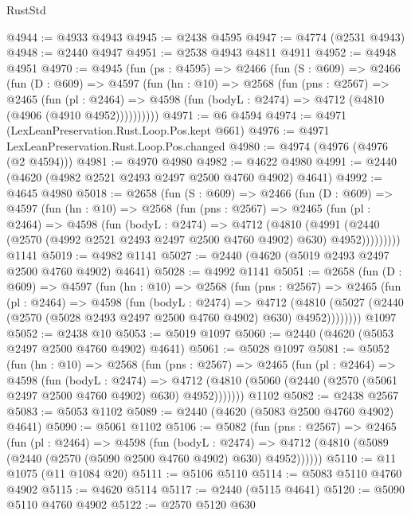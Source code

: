 \begin{lexlean}{RustStd}
\begin{coremodule}
{\begin{coremodule}
{{{{{{{{{{{{@4944 := @4933 @4943
@4945 := @2438 @4595
@4947 := @4774 (@2531 @4943)
@4948 := @2440 @4947
@4951 := @2538 @4943 @4811 @4911
@4952 := @4948 @4951
@4970 := @4945
    (fun (ps : @4595) =>
    @2466
      (fun (S : @609) =>
      @2466
        (fun (D : @609) =>
        @4597
          (fun (hn : @10) =>
          @2568
            (fun (pns : @2567) =>
            @2465
              (fun (pl : @2464) =>
              @4598 (fun (bodyL : @2474) => @4712 (@4810 (@4906 (@4910 @4952))))))))))
@4971 := @6 @4594
@4974 := @4971 (LexLeanPreservation.Rust.Loop.Pos.kept @661)
@4976 := @4971 LexLeanPreservation.Rust.Loop.Pos.changed
@4980 := @4974 (@4976 (@4976 (@2 @4594)))
@4981 := @4970 @4980
@4982 := @4622 @4980
@4991 := @2440 (@4620 (@4982 @2521 @2493 @2497 @2500 @4760 @4902) @4641)
@4992 := @4645 @4980
@5018 := @2658
    (fun (S : @609) =>
    @2466
      (fun (D : @609) =>
      @4597
        (fun (hn : @10) =>
        @2568
          (fun (pns : @2567) =>
          @2465
            (fun (pl : @2464) =>
            @4598
              (fun (bodyL : @2474) =>
              @4712
                (@4810
                  (@4991
                    (@2440 (@2570 (@4992 @2521 @2493 @2497 @2500 @4760 @4902) @630) @4952)))))))))
    @1141
@5019 := @4982 @1141
@5027 := @2440 (@4620 (@5019 @2493 @2497 @2500 @4760 @4902) @4641)
@5028 := @4992 @1141
@5051 := @2658
    (fun (D : @609) =>
    @4597
      (fun (hn : @10) =>
      @2568
        (fun (pns : @2567) =>
        @2465
          (fun (pl : @2464) =>
          @4598
            (fun (bodyL : @2474) =>
            @4712
              (@4810 (@5027 (@2440 (@2570 (@5028 @2493 @2497 @2500 @4760 @4902) @630) @4952))))))))
    @1097
@5052 := @2438 @10
@5053 := @5019 @1097
@5060 := @2440 (@4620 (@5053 @2497 @2500 @4760 @4902) @4641)
@5061 := @5028 @1097
@5081 := @5052
    (fun (hn : @10) =>
    @2568
      (fun (pns : @2567) =>
      @2465
        (fun (pl : @2464) =>
        @4598
          (fun (bodyL : @2474) =>
          @4712 (@4810 (@5060 (@2440 (@2570 (@5061 @2497 @2500 @4760 @4902) @630) @4952)))))))
    @1102
@5082 := @2438 @2567
@5083 := @5053 @1102
@5089 := @2440 (@4620 (@5083 @2500 @4760 @4902) @4641)
@5090 := @5061 @1102
@5106 := @5082
    (fun (pns : @2567) =>
    @2465
      (fun (pl : @2464) =>
      @4598
        (fun (bodyL : @2474) =>
        @4712 (@4810 (@5089 (@2440 (@2570 (@5090 @2500 @4760 @4902) @630) @4952))))))
@5110 := @11 @1075 (@11 @1084 @20)
@5111 := @5106 @5110
@5114 := @5083 @5110 @4760 @4902
@5115 := @4620 @5114
@5117 := @2440 (@5115 @4641)
@5120 := @5090 @5110 @4760 @4902
@5122 := @2570 @5120 @630
}}}}}}}}}}}}
\end{coremodule}}
\end{coremodule}
\end{lexlean}
